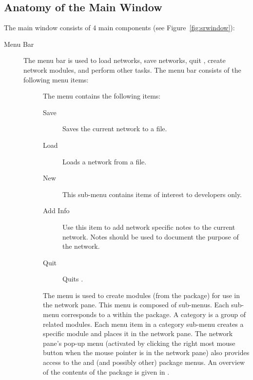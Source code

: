 \subsection{Anatomy of the Main Window}
\label{sec:windowanatomy}

The \sr{} main window consists of 4 main components (see
Figure~\ref{fig:srwindow}): 

\begin{description}
\item[Menu Bar] The menu bar is used to load networks, save networks, quit
  \sr, create network modules, and perform other tasks.  The menu bar
  consists of the following menu items:

  \begin{description}
  \item[] The  menu contains the following items:
    \begin{description}
    \item[Save] Saves the current network to a file.
    \item[Load] Loads a network from a file.
    \item[New] This sub-menu contains items of interest to developers only.
    \item[Add Info] Use this item to add network specific notes to
      the current network.  Notes should be used to document the purpose of
      the network.
    \item[Quit] Quits \sr.
    \end{description}
  \end{description}
  
  \begin{description}
  \item[] The  menu is used to create modules
    (from the \sr{} package) for use in the network pane.  This menu is
    composed of sub-menus. Each sub-menu corresponds to a 
     within the \sr{} package.  A category is a group of
    related modules.  Each menu item in a category sub-menu creates a
    specific module and places it in the network pane.  The network pane's
    pop-up menu (activated by clicking the right most mouse button when the
    mouse pointer is in the network pane) also provides access to the
    \menu{\sr{}} and \menu{\pse{}} (and possibly other) package menus.  An
    overview of the contents of the \sr{} package is given in .
  \end{description}


\end{description}
